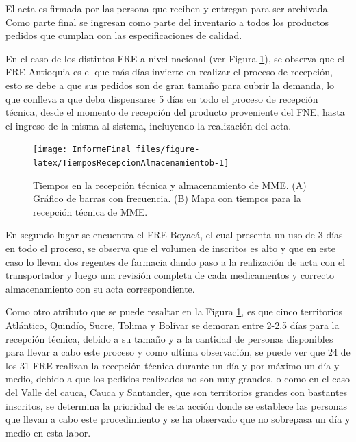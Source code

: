 \documentclass[
]{book}
\begin{document}
El acta es firmada por las persona que reciben y entregan para ser archivada. Como parte final se ingresan como parte del inventario a todos los productos pedidos que cumplan con las especificaciones de calidad.

En el caso de los distintos FRE a nivel nacional (ver Figura \ref{fig:TiemposRecepcionAlmacenamientob}), se observa que el FRE Antioquia es el que más días invierte en realizar el proceso de recepción, esto se debe a que sus pedidos son de gran tamaño para cubrir la demanda, lo que conlleva a que deba dispensarse 5 días en todo el proceso de recepción técnica, desde el momento de recepción del producto proveniente del FNE, hasta el ingreso de la misma al sistema, incluyendo la realización del acta.

\begin{figure}

{\centering \texttt{[image: InformeFinal\_files/figure-latex/TiemposRecepcionAlmacenamientob-1]} 

}

\caption{Tiempos en la recepción técnica y almacenamiento de MME. (A) Gráfico de barras con frecuencia. (B) Mapa con tiempos para la recepción técnica de MME.}\label{fig:TiemposRecepcionAlmacenamientob}
\end{figure}

En segundo lugar se encuentra el FRE Boyacá, el cual presenta un uso de 3 días en todo el proceso, se observa que el volumen de inscritos es alto y que en este caso lo llevan dos regentes de farmacia dando paso a la realización de acta con el transportador y luego una revisión completa de cada medicamentos y correcto almacenamiento con su acta correspondiente.

Como otro atributo que se puede resaltar en la Figura \ref{fig:TiemposRecepcionAlmacenamientob}, es que cinco territorios Atlántico, Quindío, Sucre, Tolima y Bolívar se demoran entre 2-2.5 días para la recepción técnica, debido a su tamaño y a la cantidad de personas disponibles para llevar a cabo este proceso y como ultima observación, se puede ver que 24 de los 31 FRE realizan la recepción técnica durante un día y por máximo un día y medio, debido a que los pedidos realizados no son muy grandes, o como en el caso del Valle del cauca, Cauca y Santander, que son territorios grandes con bastantes inscritos, se determina la prioridad de esta acción donde se establece las personas que llevan a cabo este procedimiento y se ha observado que no sobrepasa un día y medio en esta labor.
\end{document}
